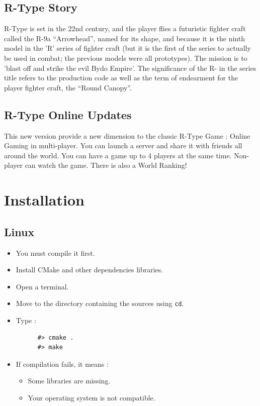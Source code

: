 \documentclass{koala-fr}
\begin{document}
\section{R-Type Story}

R-Type is set in the 22nd century, and the player flies a futuristic fighter craft called the R-9a ``Arrowhead'', named for its shape, and because it is the ninth model in the 'R' series of fighter craft (but it is the first of the series to actually be used in combat; the previous models were all prototypes). The mission is to 'blast off and strike the evil Bydo Empire'. The significance of the R- in the series title refers to the production code as well as the term of endearment for the player fighter craft, the ``Round Canopy''.

\section{R-Type Online Updates}

This new version provide a new dimension to the classic R-Type Game : Online Gaming in multi-player. You can launch a server and share it with friends all around the world. You can have a game up to 4 players at the same time. Non-player can watch the game. There is also a World Ranking!

\chapter{Installation}

\section{Linux}

\begin{itemize}
  \item You must compile it first.
  \item Install CMake and other dependencies libraries.
  \item Open a terminal.
  \item Move to the directory containing the sources using \texttt{cd}.
  \item Type :
    \begin{lstlisting}
      #> cmake .
      #> make
    \end{lstlisting}
  \item If compilation fails, it means :
    \begin{itemize}
      \item Some libraries are missing.
      \item Your operating system is not compatible.
    \end{itemize}
\end{itemize}
\end{document}
